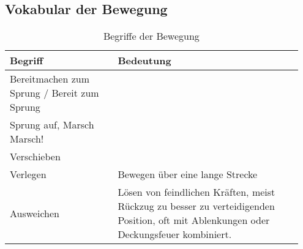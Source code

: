 \subsection{Vokabular der Bewegung}
	\begin{longtable}{|p{0.35\linewidth} | p{0.6\linewidth} |}
		\caption[Vokabular Bewegung]{Begriffe der Bewegung} \\
		\hline
		\textbf{Begriff} & \textbf{Bedeutung} \\
		\hline
		Bereitmachen zum Sprung / Bereit zum Sprung & \\
		\hline
		Sprung auf, Marsch Marsch! & \\
		\hline
		Verschieben & \\
		\hline
		Verlegen & Bewegen über eine lange Strecke \\
		\hline
		Ausweichen & Lösen von feindlichen Kräften, meist Rückzug zu besser zu verteidigenden Position, oft mit Ablenkungen oder Deckungsfeuer kombiniert.\\
		\hline
	\end{longtable}